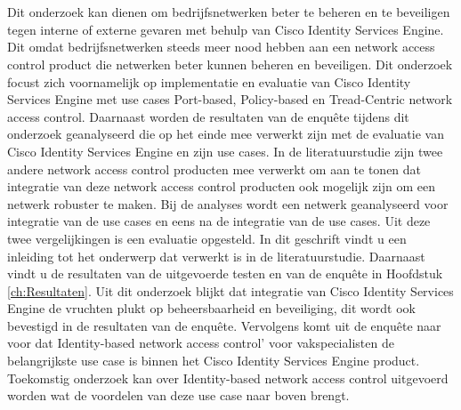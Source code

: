 \chapter*{}
\label{ch:Samenvatting}

Dit onderzoek kan dienen om bedrijfsnetwerken beter te beheren en te beveiligen tegen interne of externe gevaren met behulp van Cisco Identity Services Engine. Dit omdat bedrijfsnetwerken steeds meer nood hebben aan een network access control product die netwerken beter kunnen beheren en beveiligen. Dit onderzoek focust zich voornamelijk op implementatie en evaluatie van Cisco Identity Services Engine met use cases Port-based, Policy-based en Tread-Centric network access control. 
\newline
\newline
Daarnaast worden de resultaten van de enquête tijdens dit onderzoek geanalyseerd die op het einde mee verwerkt zijn met de evaluatie van Cisco Identity Services Engine en zijn use cases. In de literatuurstudie zijn twee andere network access control producten mee verwerkt om aan te tonen dat integratie van deze network access control producten ook mogelijk zijn om een netwerk robuster te maken. Bij de analyses wordt een netwerk geanalyseerd voor integratie van de use cases en eens na de integratie van de use cases. Uit deze twee vergelijkingen is een evaluatie opgesteld. In dit geschrift vindt u een inleiding tot het onderwerp dat verwerkt is in de literatuurstudie. Daarnaast vindt u de resultaten van de uitgevoerde testen en van de enquête in Hoofdstuk \ref{ch:Resultaten}. 
\newline
\newline
Uit dit onderzoek blijkt dat integratie van Cisco Identity Services Engine de vruchten plukt op beheersbaarheid en beveiliging, dit wordt ook bevestigd in de resultaten van de enquête. Vervolgens komt uit de enquête naar voor dat Identity-based network access control' voor vakspecialisten de belangrijkste use case is binnen het Cisco Identity Services Engine product. Toekomstig onderzoek kan over Identity-based network access control uitgevoerd worden wat de voordelen van deze use case naar boven brengt.

